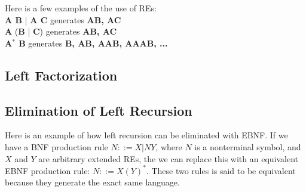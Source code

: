 Here is a few examples of the use of REs: \\
\textbf{A B} | \textbf{A C} generates \textbf{{AB, AC}} \\
\textbf{A} (\textbf{B} | \textbf{C}) generates \textbf{{AB, AC}} \\
\textbf{A$^*$ B} generates \textbf{{B, AB, AAB, AAAB, ...}} \\


\subsection*{Left Factorization}



\subsection*{Elimination of Left Recursion}
Here is an example of how left recursion can be eliminated with EBNF. If we have a BNF production rule $N ::= X | N Y$, where $N$ is a nonterminal symbol, and $X$ and $Y$ are arbitrary extended REs, the we can replace this with an equivalent EBNF production rule: $N ::= X (Y)^*$. These two rules is said to be equivalent because they generate the exact same language.